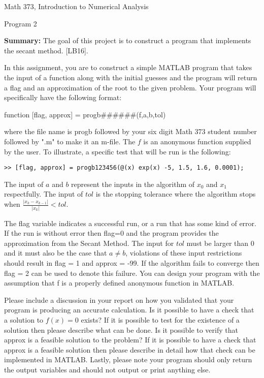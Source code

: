 \documentclass{article}
\renewcommand{\cite}[1]{[#1]}
\def\ds{\displaystyle}
\begin{document}

\large

{\Large Math 373, Introduction to Numerical Analysis}


{\Large Program 2} \par \medskip \noindent
%
{\bf Summary:} The goal of this project is to construct a program that implements the secant method. \cite{LB16}. 
\par \bigskip \par \noindent
In this assignment, you are to construct a simple MATLAB program that takes the input of a function along with the initial guesses and the program will return a flag and an approximation of the root to the given problem.  Your program will specifically have the following format: \par \medskip
function [flag, approx] = progb\#\#\#\#\#\#(f,a,b,tol) \par \medskip \noindent
%
where the file name is progb followed by your six digit Math 373 student number  followed by ".m" to make it an m-file. The $f$ is an anonymous function supplied by the user. To illustrate, a specific test that will be run is the following: 
\begin{verbatim}
>> [flag, approx] = progb123456(@(x) exp(x) -5, 1.5, 1.6, 0.0001);
\end{verbatim}
The input of $a$ and $b$ represent the inputs in the algorithm of $\ds x_0$ and $\ds x_1$ respectfully. The input of $tol$ is the stopping tolerance where the algorithm stops when $\ds \frac {\vert x_k - x_{k-1}\vert }{\vert x_k \vert } < tol$.

The flag variable indicates a successful run, or a run that has some kind of error. If the run is without error then flag=0 and the program provides the approximation from the Secant Method. The input for $tol$ must be larger than 0 and it must also be the case that $\ds a \neq b$, violations of these input restrictions should result in flag = 1 and approx = -99. If the algorithm fails to converge then flag = 2 can be used to denote this failure. You can design your program with the assumption that f is a properly defined anonymous function in MATLAB. 

Please include a discussion in your report on how you validated that your program is producing an accurate calculation. Is it possible to have a check that a solution to $f(x) = 0$ exists?  If it is possible to test for the existence of a solution then please describe what can be done. Is it possible to verify that approx is a feasible solution to the problem?  If it is possible to have a check that approx is a feasible solution then please describe in detail how that check can be implemented in MATLAB. Lastly, please note your program should only return the output variables and should not output or print anything else. 
\end{document}
